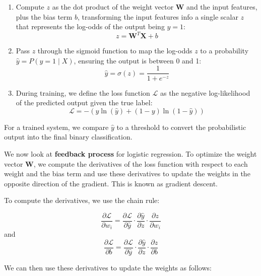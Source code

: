 \documentclass[conference]{IEEEtran}
\begin{document}
	\begin{enumerate}[]
		\item Compute $z$ as the dot product of the weight vector $\textbf{W}$ and the input features, plus the bias term $b$, transforming the input features info a single scalar $z$ that represents the log-odds of the output being $y=1$: 
		\begin{equation}
			z= \textbf{W}^{T}\textbf{X} + b
		\end{equation}
		
		\item Pass $z$ through the sigmoid function to map the log-odds $z$ to a probability $\hat{y} = P(y = 1 \mid X)$, ensuring the output is between 0 and 1: 
		\begin{equation}
			\hat{y} = \sigma(z) = \frac{1}{1 + e^{-z}}
		\end{equation}

		\item During training, we define the loss function $\mathcal{L}$ as the negative log-likelihood of the predicted output given the true label: 
		\begin{equation}
			\mathcal{L} = -\left(y\ln(\hat{y}) + (1-y)\ln(1-\hat{y})\right)
		\end{equation}
	\end{enumerate}
	
	For a trained system, we compare $\hat{y}$ to a threshold to convert the probabilistic output into the final binary classification.
	
	\bigskip
	
	We now look at \textbf{feedback process} for logistic regression. To optimize the weight vector $\textbf{W}$, we compute the derivatives of the loss function with respect to each weight and the bias term and use these derivatives to update the weights in the opposite direction of the gradient. This is known as gradient descent.
	
	To compute the derivatives, we use the chain rule:
	
	$$
	\frac{\partial\mathcal{L}}{\partial w_i} =
	\frac{\partial\mathcal{L}}{\partial \hat{y}} \cdot
	\frac{\partial \hat{y}}{\partial z} \cdot
	\frac{\partial z}{\partial w_i}
	$$ and
	$$
	\frac{\partial\mathcal{L}}{\partial b} =
	\frac{\partial\mathcal{L}}{\partial \hat{y}} \cdot
	\frac{\partial \hat{y}}{\partial z} \cdot
	\frac{\partial z}{\partial b}
	$$
	
	We can then use these derivatives to update the weights as follows:
	
\end{document}
